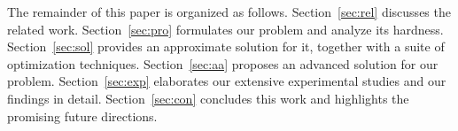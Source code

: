 %




%
%

%
%
The remainder of this paper is organized as follows.
Section~\ref{sec:rel} discusses the related work.
Section~\ref{sec:pro} formulates our problem and analyze its hardness.
Section~\ref{sec:sol} provides an approximate solution for it, together with a suite of optimization techniques.
Section~\ref{sec:aa} proposes an advanced solution for our problem.
Section~\ref{sec:exp} elaborates our extensive experimental studies and our findings in detail.
Section~\ref{sec:con} concludes this work and highlights the promising future directions.
